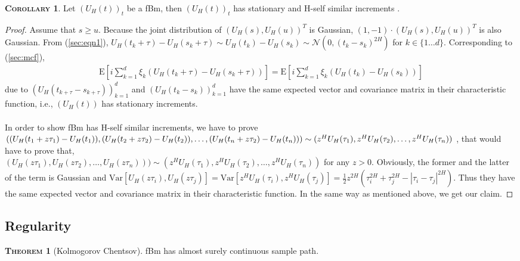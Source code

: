 \documentclass[a4paper, twoside, 11pt]{article}
\theoremstyle{definition}
\newtheorem{theorem}[definition]{\scshape Theorem}
\newtheorem{corollary}[definition]{\scshape Corollary}
\begin{document}
	\begin{corollary}
	  Let $(U_H(t))_{t}$ be a fBm, then $(U_H(t))_{t}$ has stationary and H-self similar increments . 
	\end{corollary}
	\begin{proof}
	  Assume that $s \ge u $. Because the joint distribution of $(U_H(s), U_H(u))^T$ is Gaussian, $(1, -1) \cdot (U_H(s), U_H(u))^T $ is also Gaussian. From (\ref{sec:eqn1}),  $U_H(t_k+\tau) - U_H(s_k+\tau) \sim U_H(t_k) - U_H(s_k) \sim \mathcal{N}(0, (t_k - s_k)^{2H})$ for $k \in \{1\dots d\}$. Corresponding to  (\ref{sec:mcf}), 
		\begin{eqnarray*}
		\mathrm{E}[i\sum_{k=1}^{d}\xi_k (U_H(t_k + \tau) - U_H(s_k + \tau))] = \mathrm{E} [i\sum_{k=1}^{d}\xi_k (U_H(t_k) - U_H(s_k))]
	  \end{eqnarray*}
	  due to $(U_H(t_{k+\tau} - s_{k+\tau}))_{k=1}^{d}$ and $(U_H(t_k - s_k))_{k=1}^{d}$ have the same expected vector and covariance matrix in their characteristic function, i.e., $(U_H(t))$ has stationary increments.\\
	  \\
	   In order to show fBm has H-self similar increments, we have to prove\\ 
	   $((U_H(t_1+z\tau_1) - U_H(t_1)), (U_H(t_2+z\tau_2) - U_H(t_2)),\dots, (U_H(t_n+z\tau_2) - U_H(t_n))) \sim \\
	   (z^HU_H(\tau_1), z^HU_H(\tau_2),\dots, z^HU_H(\tau_n))$ , that would have to prove that,\\
	   $(U_H(z\tau_1), U_H(z\tau_2),\dots, U_H(z\tau_n))) \sim (z^HU_H(\tau_1), z^HU_H(\tau_2),\dots, z^HU_H(\tau_n))$ for any $z > 0$. Obviously, the former and the latter of the term is Gaussian and $\mathrm{Var}[U_H(z\tau_i), U_H(z\tau_j)] = \mathrm{Var}[z^HU_H(\tau_i), z^HU_H(\tau_j)] = \frac{1}{2}z^{2H}(\tau_i^{2H} + \tau_j^{2H} - |\tau_i-\tau_j|^{2H})$. Thus they have the same expected vector and covariance matrix in their characteristic function. In the same way as mentioned above, we get our claim.
	\end{proof}

	\subsection{Regularity}
	\begin{theorem}[Kolmogorov Chentsov]
	  fBm has almost surely continuous sample path.  
	\end{theorem}
\end{document}
